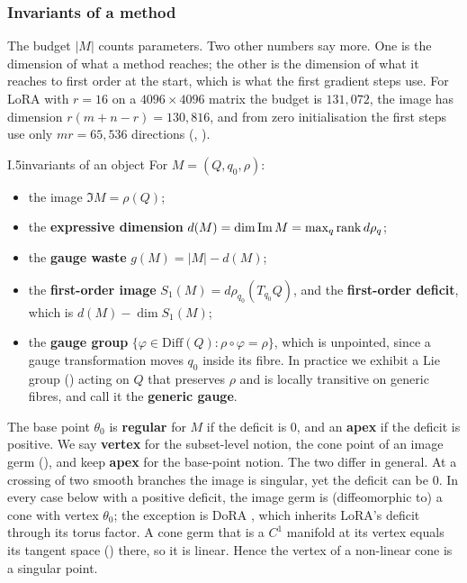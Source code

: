 \subsubsection{Invariants of a method}\label{sec:slice-invariants}

The budget $\lvert M\rvert$ counts parameters. Two other numbers say more. One is the dimension of what a method
reaches; the other is the dimension of what it reaches to first order at the start, which is what the first gradient steps
use. For LoRA with $r=16$
on a $4096\times4096$ matrix the budget is $131{,}072$, the image has dimension $r(m+n-r)=130{,}816$, and from zero
initialisation the first steps use only $mr=65{,}536$ directions (, ).

\begin{definition}{I.5}{invariants of an object}
For $M=(Q,q_0,\rho)$:
\begin{itemize}
  \item the image $\Im M=\rho(Q)$;
  \item the \textbf{expressive dimension} $d(M)=\dim\operatorname{Im} M=\max_q\operatorname{rank} d\rho_q$;
  \item the \textbf{gauge waste} $g(M)=\lvert M\rvert-d(M)$;
  \item the \textbf{first-order image} $S_1(M)=d\rho_{q_0}(T_{q_0}Q)$, and the \textbf{first-order deficit}, which is
    $d(M)-\dim S_1(M)$;
  \item the \textbf{gauge group} $\{\varphi\in\mathrm{Diff}(Q):\rho\circ\varphi=\rho\}$, which is unpointed, since a gauge
    transformation moves $q_0$ inside its fibre. In practice we exhibit a Lie group () acting on $Q$ that
    preserves $\rho$ and is locally transitive on generic fibres, and call it the \textbf{generic gauge}.
\end{itemize}
The base point $\theta_0$ is \textbf{regular} for $M$ if the deficit is $0$, and an \textbf{apex} if the deficit is
positive. We say \textbf{vertex} for the subset-level notion, the cone point of an image germ (), and keep
\textbf{apex} for the base-point notion. The two differ in general. At a crossing of two smooth branches the image is
singular, yet the deficit can be $0$. In every case below with a positive deficit, the image germ is (diffeomorphic to) a
cone with vertex $\theta_0$; the exception is DoRA \citep{liu2024dora}, which inherits LoRA's deficit through its torus
factor. A cone germ that is a $C^1$ manifold at its vertex equals its tangent space () there, so it is linear.
Hence the vertex of a non-linear cone is a singular point.
\end{definition}


